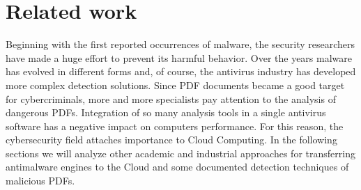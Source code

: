 \chapter{Related work}
\label{chapter:relatedWork}
Beginning with the first reported occurrences of malware, the security researchers have made a huge effort to prevent its harmful behavior. Over the years malware has evolved in different forms and, of course, the antivirus industry has developed more complex detection solutions. Since PDF documents became a good target for cybercriminals, more and more specialists pay attention to the analysis of dangerous PDFs. Integration of so many analysis tools in a single antivirus software has a negative impact on computers performance. For this reason, the cybersecurity field attaches importance to Cloud Computing. In the following sections we will analyze other academic and industrial approaches for transferring antimalware engines to the Cloud and some documented detection techniques of malicious PDFs.


